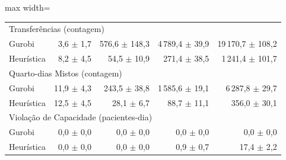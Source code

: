 \begin{table}[htbp]
\begin{adjustbox}{max width=\textwidth}
\begin{tabular}{lrrrr}
        \multicolumn{5}{l}{Transferências (contagem)} \\
        \quad Gurobi & 3,6 $\pm$ 1,7 & 576,6 $\pm$ 148,3 & 4\,789,4 $\pm$ 39,9 & 19\,170,7 $\pm$ 108,2 \\
        \quad Heurística & 8,2 $\pm$ 4,5 & 54,5 $\pm$ 10,9 & 271,4 $\pm$ 38,5 & 1\,241,4 $\pm$ 101,7 \\
        \multicolumn{5}{l}{Quarto-dias Mistos (contagem)} \\
        \quad Gurobi & 11,9 $\pm$ 4,3 & 243,5 $\pm$ 38,8 & 1\,585,6 $\pm$ 19,1 & 6\,287,8 $\pm$ 29,7 \\
        \quad Heurística & 12,5 $\pm$ 4,5 & 28,1 $\pm$ 6,7 & 88,7 $\pm$ 11,1 & 356,0 $\pm$ 30,1 \\
        \multicolumn{5}{l}{Violação de Capacidade (pacientes-dia)} \\
        \quad Gurobi & 0,0 $\pm$ 0,0 & 0,0 $\pm$ 0,0 & 0,0 $\pm$ 0,0 & 0,0 $\pm$ 0,0 \\
        \quad Heurística & 0,0 $\pm$ 0,0 & 0,0 $\pm$ 0,0 & 0,9 $\pm$ 0,7 & 17,4 $\pm$ 2,2 \\
        \hline
    \end{tabular}
    \end{adjustbox}
\end{table}
